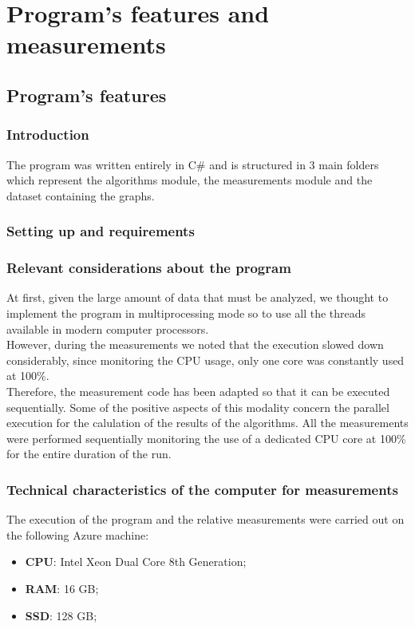 \section{Program's features and measurements}

\subsection{Program's features}

\subsubsection{Introduction}
The program was written entirely in C\# and is structured in 3 main folders which represent the algorithms module, the measurements module and the dataset containing the graphs.

\subsubsection{Setting up and requirements}

\subsubsection{Relevant considerations about the program}
At first, given the large amount of data that must be analyzed, we thought to implement the program in multiprocessing mode so to use all the threads available in modern computer processors. \\
\noindent
However, during the measurements we noted that the execution slowed down considerably, since monitoring the CPU usage, only one core was constantly used at 100\%. \\ 
\noindent
Therefore, the measurement code has been adapted so that it can be executed sequentially. Some of the positive aspects of this modality concern the parallel execution for the calulation of the results of the algorithms.
\noindent
All the measurements were performed sequentially monitoring the use of a dedicated CPU core at 100\% for the entire duration of the run.

\subsubsection{Technical characteristics of the computer for measurements}
The execution of the program and the relative measurements were carried out on the following Azure machine:
\begin{itemize}
    \item \textbf{CPU}: Intel Xeon Dual Core 8th Generation;
    \item \textbf{RAM}: 16 GB;
    \item \textbf{SSD}: 128 GB;
\end{itemize}

